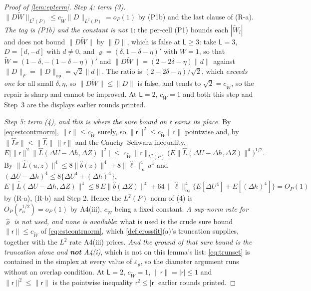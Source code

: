 \begin{proof}[Proof of \cref{lem:epterm}]
\emph{Step 4: term \textup{(3)}.} $\|D\widetilde W\|_{L^{2}(P)}\le c_{\widetilde W}\|D\|_{L^{2}(P)}=o_P(1)$
by \textup{(P1b)} and the
last clause of (R-a). \emph{The tag is \textup{(P1b)} and the constant is not $1$}: the per-cell
\textup{(P1)} bounds each $|\widetilde W_l|$ and does not bound $\|D\widetilde W\|$ by $\|D\|$, which is
false at $\mathsf L\ge3$: take $\mathsf L=3$, $D=[d,-d]$ with $d\ne0$, and $\varrho=(\delta,1-\delta-\eta)'$
with $W=1$, so that $\widetilde W=(1-\delta,-(1-\delta-\eta))'$ and
$\|D\widetilde W\|=(2-2\delta-\eta)\|d\|$ against $\|D\|_{F}=\|D\|_{\mathrm{op}}=\sqrt2\|d\|$. The ratio is
$(2-2\delta-\eta)/\sqrt2$, which \emph{exceeds one} for all small $\delta,\eta$, so
$\|D\widetilde W\|\le\|D\|$ is false, and tends to $\sqrt2=c_{\widetilde W}$, so the repair is sharp and
cannot be improved. At $\mathsf L=2$,
$c_{\widetilde W}=1$ and both this step and Step~3 are the displays earlier rounds printed.

\emph{Step 5: term \textup{(4)}, and this is where the sure bound on $\mathsf r$ earns its place.} By
\eqref{eq:estcontrnorm}, $\|\mathsf r\|\le c_{\widetilde W}$ surely, so
$\|\mathsf r\|^{2}\le c_{\widetilde W}\|\mathsf r\|$
pointwise and, by $\|\hat L\mathsf r\|\le\|\hat L\|\,\|\mathsf r\|$ and the Cauchy--Schwarz inequality,
\[
E\big[\big\|\mathsf r\big\|^{2}\big\|\hat L(\Delta U-\Delta h,\Delta Z)\big\|^{2}\big]
\;\le\;c_{\widetilde W}\,\big\|\mathsf r\big\|_{L^{2}(P)}\Big(E\big\|\hat L(\Delta U-\Delta h,\Delta Z)\big\|^{4}\Big)^{1/2}.
\]
By $\|\hat L(u,z)\|^{4}\le8\|\hat b(z)\|^{4}+8\|\hat\ell\|^{4}_\infty u^{4}$ and
$(\Delta U-\Delta h)^{4}\le8\{\Delta U^{4}+(\Delta h)^{4}\}$,
\[
E\big\|\hat L(\Delta U-\Delta h,\Delta Z)\big\|^{4}
\le8\,E\|\hat b(\Delta Z)\|^{4}+64\,\|\hat\ell\|^{4}_\infty\big\{E[\Delta U^{4}]+E[(\Delta h)^{4}]\big\}=O_P(1)
\]
by (R-a), (R-b) and Step 2. Hence the $L^{2}(P)$ norm of (4) is $O_P(r_n^{1/2})=o_P(1)$ by A4(iii),
$c_{\widetilde W}$ being a fixed constant.
\emph{A sup-norm rate for $\hat\varrho$ is not used, and none is available}: what is used is the crude
sure bound $\|\mathsf r\|\le c_{\widetilde W}$ of \eqref{eq:estcontrnorm}, which \cref{def:crossfit}(a)'s
truncation supplies, together with the
$L^{2}$ rate A4(iii) prices. \emph{And the ground of that sure bound is the truncation alone and
\textbf{not} A4(i)}, which is not on this lemma's list: \eqref{eq:trunset} is contained in the simplex at
every value of $\varepsilon_\varrho$, so the diameter argument runs without an overlap condition.
At $\mathsf L=2$, $c_{\widetilde W}=1$, $\|\mathsf r\|=|\mathsf r|\le1$ and
$\|\mathsf r\|^{2}\le\|\mathsf r\|$ is the pointwise inequality $\mathsf r^{2}\le|\mathsf r|$ earlier
rounds printed.


\end{proof}
